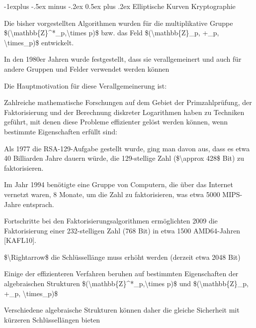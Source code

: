 \documentclass[a4paper]{article}
\makeatletter
\renewcommand{\subsection}{\@startsection{subsection}{2}{0mm}%
 {-1explus -.5ex minus -.2ex}%
 {0.5ex plus .2ex}%
 {\normalfont\normalsize\bfseries}}
\makeatother
\begin{document}
\begin{multicols}{3}
      \subsection{Elliptische Kurven
            Kryptographie}

      \begin{itemize*}
            \item Die bisher vorgestellten Algorithmen wurden für die multiplikative
            Gruppe \$(\textbackslash mathbb\{Z\}\^{}*\_p,\textbackslash times p)\$
            bzw. das Feld \$(\textbackslash mathbb\{Z\}\_p, +\_p,
            \textbackslash times\_p)\$ entwickelt.
            \item In den 1980er Jahren wurde festgestellt, dass sie verallgemeinert und
            auch für andere Gruppen und Felder verwendet werden können
            \item Die Hauptmotivation für diese Verallgemeinerung ist:
            \begin{itemize*}
                  \item Zahlreiche mathematische Forschungen auf dem Gebiet der Primzahlprüfung, der Faktorisierung und der Berechnung diskreter Logarithmen haben zu Techniken geführt, mit denen diese Probleme effizienter gelöst werden können, wenn bestimmte Eigenschaften erfüllt sind:
                  \begin{itemize*} \item Als 1977 die RSA-129-Aufgabe gestellt wurde, ging man davon aus, dass es etwa 40 Billiarden Jahre dauern würde, die 129-stellige Zahl (\$\textbackslash approx 428\$ Bit) zu faktorisieren. \item Im Jahr 1994 benötigte eine Gruppe von Computern, die über das Internet vernetzt waren, 8 Monate, um die Zahl zu faktorisieren, was etwa 5000 MIPS-Jahre entsprach. \item Fortschritte bei den Faktorisierungsalgorithmen ermöglichten 2009 die Faktorisierung einer 232-stelligen Zahl (768 Bit) in etwa 1500 AMD64-Jahren {[}KAFL10{]}. \item \$\textbackslash Rightarrow\$ die Schlüssellänge muss erhöht werden (derzeit etwa 2048 Bit) \end{itemize*}
                  \item Einige der effizienteren Verfahren beruhen auf bestimmten Eigenschaften der algebraischen Strukturen \$(\textbackslash mathbb\{Z\}\^{}*\_p,\textbackslash times p)\$ und \$(\textbackslash mathbb\{Z\}\_p, +\_p, \textbackslash times\_p)\$
                  \item Verschiedene algebraische Strukturen können daher die gleiche Sicherheit mit kürzeren Schlüssellängen bieten

\end{itemize*}
\end{itemize*}
\end{multicols}
\end{document}
